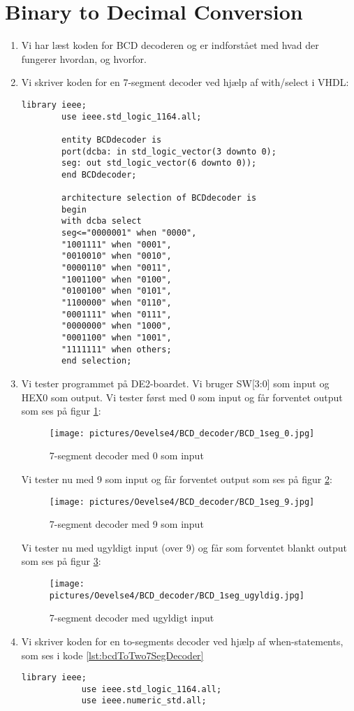 \section{Binary to Decimal Conversion}
\begin{enumerate}
	\item[1)]
	Vi har læst koden for BCD decoderen og er indforstået med hvad der fungerer hvordan, og hvorfor.\newline
	
	\item[2)]
	Vi skriver koden for en 7-segment decoder ved hjælp af with/select i VHDL:\\
		\begin{lstlisting}[caption={BCD til 7 segment decoder},label={lst:bcdTo7SegDecoder}]
		library ieee;
		use ieee.std_logic_1164.all;
		
		entity BCDdecoder is
		port(dcba: in std_logic_vector(3 downto 0);
		seg: out std_logic_vector(6 downto 0));
		end BCDdecoder;
		
		architecture selection of BCDdecoder is
		begin
		with dcba select
		seg<="0000001" when "0000",
		"1001111" when "0001",
		"0010010" when "0010",
		"0000110" when "0011",
		"1001100" when "0100",
		"0100100" when "0101",
		"1100000" when "0110",
		"0001111" when "0111",
		"0000000" when "1000",
		"0001100" when "1001",
		"1111111" when others;
		end selection;	
		\end{lstlisting}
		
\item[3)]
	Vi tester programmet på DE2-boardet. Vi bruger SW[3:0] som input og HEX0 som output. Vi tester først med 0 som input og får forventet output som ses på figur \ref{fig:7SegDecoder0}:
	\begin{figure}[h]
		\centering
		\texttt{[image: pictures/Oevelse4/BCD\_decoder/BCD\_1seg\_0.jpg]}
		\caption{7-segment decoder med 0 som input}
		\label{fig:7SegDecoder0}
	\end{figure}

Vi tester nu med 9 som input og får forventet output som ses på figur \ref{fig:7SegDecoder9}:
\begin{figure}[h]
	\centering
	\texttt{[image: pictures/Oevelse4/BCD\_decoder/BCD\_1seg\_9.jpg]}
	\caption{7-segment decoder med 9 som input}
	\label{fig:7SegDecoder9}
\end{figure}

Vi tester nu med ugyldigt input (over 9) og får som forventet blankt output som ses på figur \ref{fig:7SegDecoderUgyldig}:
\begin{figure}[h]
	\centering
	\texttt{[image: pictures/Oevelse4/BCD\_decoder/BCD\_1seg\_ugyldig.jpg]}
	\caption{7-segment decoder med ugyldigt input}
	\label{fig:7SegDecoderUgyldig}
\end{figure}
\pagebreak
\item[4)]
	Vi skriver koden for en to-segments decoder ved hjælp af when-statements, som ses i kode  \ref{lst:bcdToTwo7SegDecoder}
			\begin{lstlisting}[caption={BCD til to 7 segment decoder},label={lst:bcdToTwo7SegDecoder}]
			library ieee;
			use ieee.std_logic_1164.all;
			use ieee.numeric_std.all;
			

\end{lstlisting}
\end{enumerate}
